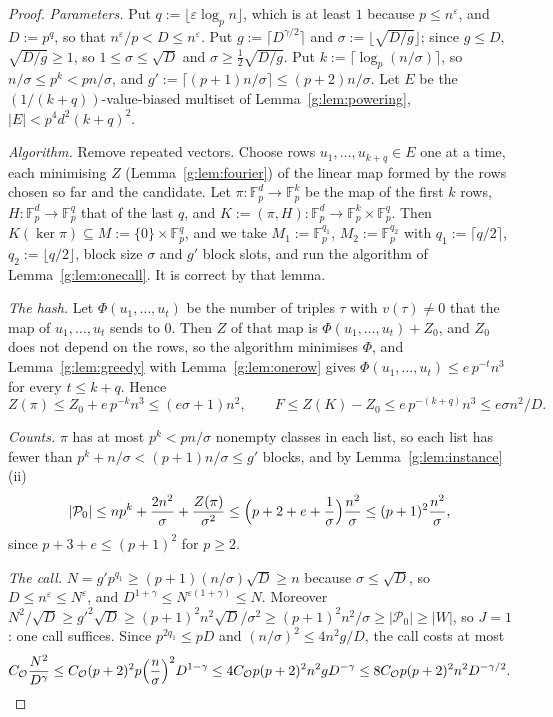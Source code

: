 \documentclass[11pt]{article}
\theoremstyle{definition}
\theoremstyle{remark}
\newcommand{\Fp}{\mathbb{F}_p}
\newcommand{\eps}{\varepsilon}
\newcommand{\Pq}{\mathcal{P}}
\begin{document}
\begin{proof}
\emph{Parameters.} Put $q:=\lfloor\eps\log_pn\rfloor$, which is at least $1$ because $p\le n^\eps$, and $D:=p^q$, so that $n^\eps/p<D\le n^\eps$. Put $g:=\lceil D^{\gamma/2}\rceil$ and $\sigma:=\lfloor\sqrt{D/g}\rfloor$; since $g\le D$, $\sqrt{D/g}\ge1$, so $1\le\sigma\le\sqrt D$ and $\sigma\ge\frac12\sqrt{D/g}$. Put $k:=\lceil\log_p(n/\sigma)\rceil$, so $n/\sigma\le p^k<pn/\sigma$, and $g':=\lceil(p+1)n/\sigma\rceil\le(p+2)n/\sigma$. Let $E$ be the $(1/(k+q))$-value-biased multiset of Lemma~\ref{g:lem:powering}, $|E|<p^4d^2(k+q)^2$.

\emph{Algorithm.} Remove repeated vectors. Choose rows $u_1,\dots,u_{k+q}\in E$ one at a time, each minimising $Z$ (Lemma~\ref{g:lem:fourier}) of the linear map formed by the rows chosen so far and the candidate. Let $\pi\colon\Fp^d\to\Fp^k$ be the map of the first $k$ rows, $H\colon\Fp^d\to\Fp^q$ that of the last $q$, and $K:=(\pi,H)\colon\Fp^d\to\Fp^k\times\Fp^q$. Then $K(\ker\pi)\subseteq M:=\{0\}\times\Fp^q$, and we take $M_1:=\Fp^{q_1}$, $M_2:=\Fp^{q_2}$ with $q_1:=\lceil q/2\rceil$, $q_2:=\lfloor q/2\rfloor$, block size $\sigma$ and $g'$ block slots, and run the algorithm of Lemma~\ref{g:lem:onecall}. It is correct by that lemma.

\emph{The hash.} Let $\Phi(u_1,\dots,u_t)$ be the number of triples $\tau$ with $v(\tau)\ne0$ that the map of $u_1,\dots,u_t$ sends to $0$. Then $Z$ of that map is $\Phi(u_1,\dots,u_t)+Z_0$, and $Z_0$ does not depend on the rows, so the algorithm minimises $\Phi$, and Lemma~\ref{g:lem:greedy} with Lemma~\ref{g:lem:onerow} gives $\Phi(u_1,\dots,u_t)\le e\,p^{-t}n^3$ for every $t\le k+q$. Hence
\[
Z(\pi)\le Z_0+e\,p^{-k}n^3\le(e\sigma+1)n^2,\qquad F\le Z(K)-Z_0\le e\,p^{-(k+q)}n^3\le e\sigma n^2/D .
\]

\emph{Counts.} $\pi$ has at most $p^k<pn/\sigma$ nonempty classes in each list, so each list has fewer than $p^k+n/\sigma<(p+1)n/\sigma\le g'$ blocks, and by Lemma~\ref{g:lem:instance}(ii)
\[
|\Pq_0|\le np^k+\frac{2n^2}\sigma+\frac{Z(\pi)}{\sigma^2}\le\Bigl(p+2+e+\frac1\sigma\Bigr)\frac{n^2}\sigma\le(p+1)^2\frac{n^2}\sigma,
\]
since $p+3+e\le(p+1)^2$ for $p\ge2$.

\emph{The call.} $N=g'p^{q_1}\ge(p+1)(n/\sigma)\sqrt D\ge n$ because $\sigma\le\sqrt D$, so $D\le n^\eps\le N^\eps$, and $D^{1+\gamma}\le N^{\eps(1+\gamma)}\le N$. Moreover $N^2/\sqrt D\ge g'^2\sqrt D\ge(p+1)^2n^2\sqrt D/\sigma^2\ge(p+1)^2n^2/\sigma\ge|\Pq_0|\ge|W|$, so $J=1$: one call suffices. Since $p^{2q_1}\le pD$ and $(n/\sigma)^2\le4n^2g/D$, the call costs at most
\[
C_{\mathcal O}\frac{N^2}{D^\gamma}\le C_{\mathcal O}(p+2)^2p\Bigl(\frac n\sigma\Bigr)^2D^{1-\gamma}\le4C_{\mathcal O}p(p+2)^2n^2gD^{-\gamma}\le8C_{\mathcal O}p(p+2)^2n^2D^{-\gamma/2}.
\]


\end{proof}
\end{document}
